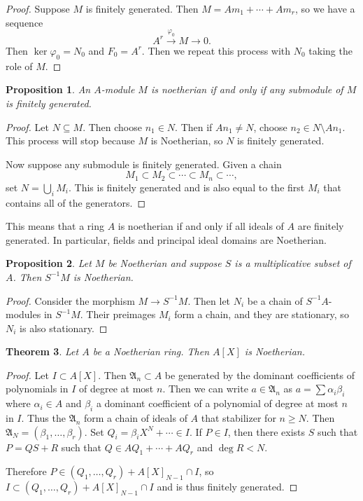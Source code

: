 \documentclass[leqno, openany]{memoir}
\newtheorem{thm}{Theorem}[section]
\newtheorem{prop}[thm]{Proposition}
\theoremstyle{definition}
\theoremstyle{remark}
\theoremstyle{plain}
\theoremstyle{definition}
\theoremstyle{remark}
\newcommand{\mf}[1]{\mathfrak{#1}}
\begin{document}
\begin{proof}
    Suppose $M$ is finitely generated. Then $M = A m_1 + \cdots + A m_r$, so we have a sequence
    \[ A^r \xrightarrow{\varphi_0} M \to 0. \]
    Then $\ker \varphi_0 = N_0$ and $F_0 = A^r$. Then we repeat this process with $N_0$ taking the role of $M$.
\end{proof}

\begin{prop}
    An $A$-module $M$ is noetherian if and only if any submodule of $M$ is finitely generated.
\end{prop}

\begin{proof}
    Let $N \subseteq M$. Then choose $n_1 \in N$. Then if $A n_1 \neq N$, choose $n_2 \in N \setminus A n_1$. This process will stop because $M$ is Noetherian, so $N$ is finitely generated.

    Now suppose any submodule is finitely generated. Given a chain
    \[ M_1 \subset M_2 \subset \cdots \subset M_n \subset \cdots, \]
    set $N = \bigcup_i M_i$. This is finitely generated and is also equal to the first $M_i$ that contains all of the generators.
\end{proof}

This means that a ring $A$ is noetherian if and only if all ideals of $A$ are finitely generated. In particular, fields and principal ideal domains are Noetherian.

\begin{prop}
    Let $M$ be Noetherian and suppose $S$ is a multiplicative subset of $A$. Then $S^{-1}M$ is Noetherian.
\end{prop}

\begin{proof}
    Consider the morphism $M \to S^{-1}M$. Then let $N_i$ be a chain of $S^{-1}A$-modules in $S^{-1}M$. Their preimages $M_i$ form a chain, and they are stationary, so $N_i$ is also stationary.
\end{proof}

\begin{thm}
    Let $A$ be a Noetherian ring. Then $A[X]$ is Noetherian.
\end{thm}

\begin{proof}
    Let $I \subset A[X]$. Then $\mf{A}_n \subset A$ be generated by the dominant coefficients of polynomials in $I$ of degree at most $n$. Then we can write $a \in \mf{A}_n$ as $a = \sum \alpha_i \beta_i$ where $\alpha_i \in A$ and $\beta_i$ a dominant coefficient of a polynomial of degree at most $n$ in $I$. Thus the $\mf{A}_n$ form a chain of ideals of $A$ that stabilizer for $n \geq N$. Then $\mf{A}_N = (\beta_1, \ldots, \beta_r)$. Set $Q_i = \beta_i X^N + \cdots \in I$. If $P \in I$, then there exists $S$ such that $P = QS+R$ such that $Q \in A Q_1 + \cdots + A Q_r$ and $\deg R < N$.

    Therefore $P \in (Q_1, \ldots, Q_r) + A[X]_{N-1} \cap I$, so $I \subset (Q_1, \ldots, Q_r) + A[X]_{N-1} \cap I$ and is thus finitely generated.
\end{proof}
\end{document}
